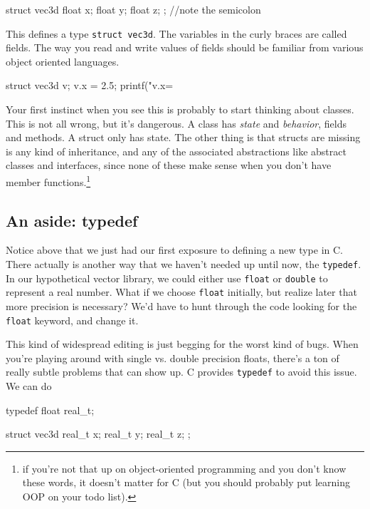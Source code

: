 \documentclass[ebook,11pt,oneside,openany]{memoir}
\begin{document}
\begin{code}[language=C]
struct vec3d {
  float x;
  float y;
  float z;
}; //note the semicolon
\end{code}

This defines a type \texttt{struct vec3d}. The variables in the curly braces are called fields. The way you read and write values of fields should be familiar from various object oriented languages.

\begin{code}[language=C]
struct vec3d v;
v.x = 2.5;
printf("v.x=%
\end{code}

Your first instinct when you see this is probably to start thinking about classes. This is not all wrong, but it's dangerous. A class has \textit{state} and \textit{behavior}, fields and methods. A struct only has state. The other thing is that structs are missing is any kind of inheritance, and any of the associated abstractions like abstract classes and interfaces, since none of these make sense when you don't have member functions.\footnote{if you're not that up on object-oriented programming and you don't know these words, it doesn't matter for C (but you should probably put learning OOP on your todo list).}

\subsection{An aside: typedef}

Notice above that we just had our first exposure to defining a new type in C. There actually is another way that we haven't needed up until now, the \texttt{typedef}. In our hypothetical vector library, we could either use \texttt{float} or \texttt{double} to represent a real number. What if we choose \texttt{float} initially, but realize later that more precision is necessary? We'd have to hunt through the code looking for the \texttt{float} keyword, and change it. 


\noindent
This kind of widespread editing is just begging for the worst kind of bugs. When you're playing around with single vs. double precision floats, there's a ton of really subtle problems that can show up. C provides \texttt{typedef} to avoid this issue. We can do 

\pagebreak

\begin{code}[language=C]
typedef float real_t;

struct vec3d {
        real_t x;
        real_t y;
        real_t z;
};
\end{code}
\end{document}
